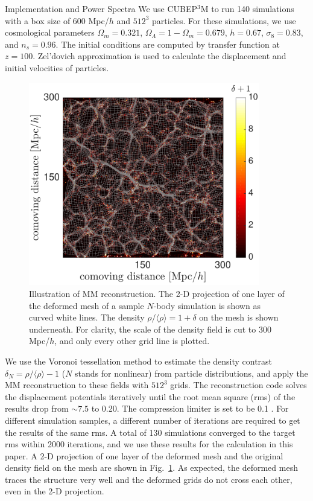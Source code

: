 \begin{section}{Implementation and Power Spectra}
  \label{sec:simulation}
  We use \textsc{CUBEP$^3$M} \cite{bib:Harnois2013} to run
  140 simulations with a box size of 600 Mpc/$h$ and $512^3$ particles.
  For these simulations, we use cosmological
  parameters $\Omega_m=0.321$, $\Omega_{\Lambda}=1-\Omega_m=0.679$,
  $h=0.67$, $\sigma_8=0.83$, and $n_s=0.96$.
  The initial conditions are computed by
  transfer function \cite{bib:Lewis2000}
  at $z=100$.
  Zel'dovich
  approximation is used to calculate the displacement and initial velocities
  of particles.

  \begin{figure}[t!]
    \centering
    \includegraphics[width=0.9\textwidth]{fig1.pdf}
    \caption{ Illustration of MM reconstruction.
      The 2-D projection of one layer of the deformed mesh of a sample
      $N$-body simulation is shown as curved white lines.  The
      density $\rho/\langle\rho\rangle=1+\delta$ on the mesh is shown
      underneath. For clarity, the scale of the density field is cut to 
      300 Mpc/$h$, and only every other grid line is plotted.}
    \label{fig:simandrec}
 \end{figure}

 We use the Voronoi tessellation method \cite{bib:Van1994} to estimate the density contrast
 $\delta_N=\rho/\langle\rho\rangle-1$ ($N$ stands for nonlinear) from particle distributions, and apply the
 MM reconstruction to these fields with $512^3$ grids.
 The reconstruction code solves the displacement potentials iteratively
 until the root mean square (rms) of the results drop from $\sim 7.5$
 to 0.20. The compression limiter is set to be 0.1 \cite{bib:Pen1995, bib:Pen1998,bib:ZhuH2016}. 
 For different simulation samples, a different number of
 iterations are required to get the results of the same rms. A total of
 130 simulations converged to the target rms within 2000 iterations, 
 and we use these results for the calculation in this paper.
 A 2-D projection
 of one layer of the deformed mesh and the original density field on
 the mesh are shown in Fig.~\ref{fig:simandrec}. 
 As expected, the deformed mesh traces the structure very well and
 the deformed grids do not cross each other, even in the 2-D projection.
 

\end{section}
